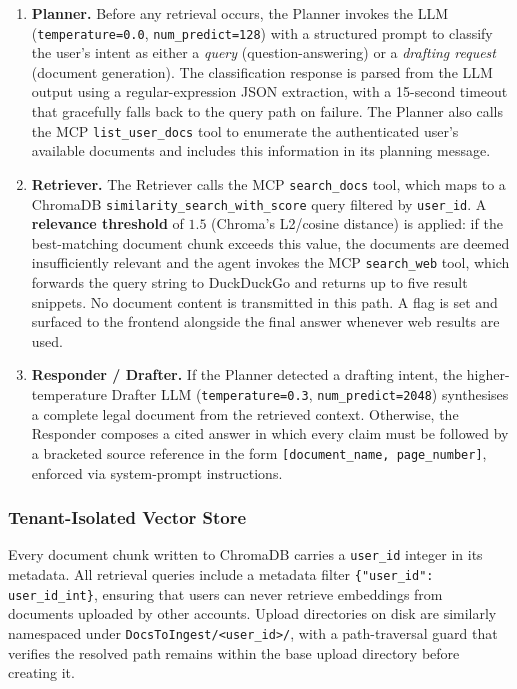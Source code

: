 \documentclass[11pt,a4paper]{article}
\begin{document}
\begin{enumerate}
    \item \textbf{Planner.}  Before any retrieval occurs, the Planner invokes the LLM
          (\texttt{temperature=0.0}, \texttt{num\_predict=128}) with a structured prompt to
          classify the user's intent as either a \textit{query} (question-answering) or a
          \textit{drafting request} (document generation).  The classification response is
          parsed from the LLM output using a regular-expression JSON extraction, with a
          15-second timeout that gracefully falls back to the query path on failure.  The
          Planner also calls the MCP \texttt{list\_user\_docs} tool to enumerate the
          authenticated user's available documents and includes this information in its
          planning message.

    \item \textbf{Retriever.}  The Retriever calls the MCP \texttt{search\_docs} tool,
          which maps to a ChromaDB \texttt{similarity\_search\_with\_score} query filtered
          by \texttt{user\_id}.  A \textbf{relevance threshold} of $1.5$ (Chroma's
          L2/cosine distance) is applied: if the best-matching document chunk exceeds this
          value, the documents are deemed insufficiently relevant and the agent invokes the
          MCP \texttt{search\_web} tool, which forwards the query string to DuckDuckGo
          and returns up to five result snippets.  No document content is transmitted in
          this path.  A flag is set and surfaced to the frontend alongside the final answer
          whenever web results are used.

    \item \textbf{Responder / Drafter.}  If the Planner detected a drafting intent, the
          higher-temperature Drafter LLM (\texttt{temperature=0.3}, \texttt{num\_predict=2048})
          synthesises a complete legal document from the retrieved context.  Otherwise, the
          Responder composes a cited answer in which every claim must be followed by a
          bracketed source reference in the form \texttt{[document\_name, page\_number]},
          enforced via system-prompt instructions.
\end{enumerate}

\subsubsection{Tenant-Isolated Vector Store}

Every document chunk written to ChromaDB carries a \texttt{user\_id} integer in its
metadata.  All retrieval queries include a metadata filter \texttt{\{"user\_id": user\_id\_int\}},
ensuring that users can never retrieve embeddings from documents uploaded by other accounts.
Upload directories on disk are similarly namespaced under \texttt{DocsToIngest/<user\_id>/},
with a path-traversal guard that verifies the resolved path remains within the base upload
directory before creating it.
\end{document}
